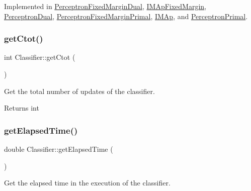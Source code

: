 Implemented in \hyperlink{class_perceptron_fixed_margin_dual_a1370fdbc95bf728f82a83f219be32d23}{Perceptron\+Fixed\+Margin\+Dual}, \hyperlink{class_i_m_ap_fixed_margin_a230aae2c6ef3f70b2e1a704b5e4dff28}{I\+M\+Ap\+Fixed\+Margin}, \hyperlink{class_perceptron_dual_a3ed5554b85b4b1ec98f57acab3eeeaca}{Perceptron\+Dual}, \hyperlink{class_perceptron_fixed_margin_primal_af72c3dde96f1f1b803c7b522b5c1cc0f}{Perceptron\+Fixed\+Margin\+Primal}, \hyperlink{class_i_m_ap_aee497c8ff854b8d584c6c9df0c57ad57}{I\+M\+Ap}, and \hyperlink{class_perceptron_primal_ac8ce9ceffe2b35b5386e5367fb419b3b}{Perceptron\+Primal}.

\mbox{\label{class_classifier_ab80a78cd6a4efc59b16f5b80cd64dc63}} 
\subsubsection{\texorpdfstring{get\+Ctot()}{getCtot()}}
{\footnotesize\ttfamily int Classifier\+::get\+Ctot (\begin{DoxyParamCaption}{ }\end{DoxyParamCaption})\hspace{0.3cm}{\ttfamily [inline]}}



Get the total number of updates of the classifier. 

\begin{DoxyReturn}{Returns}
int 
\end{DoxyReturn}
\mbox{\label{class_classifier_ab47b67b061041193aa3ae2a7856f4980}} 
\subsubsection{\texorpdfstring{get\+Elapsed\+Time()}{getElapsedTime()}}
{\footnotesize\ttfamily double Classifier\+::get\+Elapsed\+Time (\begin{DoxyParamCaption}{ }\end{DoxyParamCaption})\hspace{0.3cm}{\ttfamily [inline]}}



Get the elapsed time in the execution of the classifier. 

